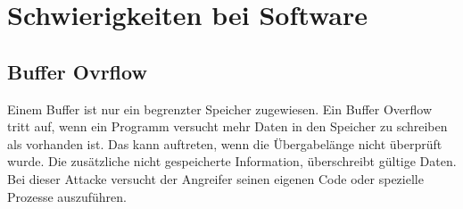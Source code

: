 \documentclass[11pt]{scrartcl}
\begin{document}
\section{Schwierigkeiten bei Software}
\label{sec:sw-trouble}

\subsection{Buffer Ovrflow}
\label{sec:buffer-overflow}
Einem Buffer ist nur ein begrenzter Speicher zugewiesen. Ein Buffer Overflow tritt auf, wenn ein Programm versucht mehr Daten in den Speicher zu schreiben als vorhanden ist. Das kann auftreten, wenn die Übergabelänge nicht überprüft wurde. Die zusätzliche nicht gespeicherte Information, überschreibt gültige Daten. Bei dieser Attacke versucht der Angreifer seinen eigenen Code oder spezielle Prozesse auszuführen. \cite{9}
\end{document}
